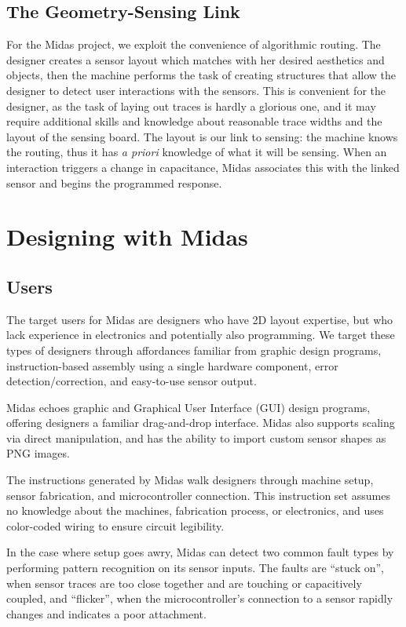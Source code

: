 \subsection{The Geometry-Sensing Link}

For the Midas project, we exploit the convenience of algorithmic routing. The designer creates a sensor layout which matches with her desired aesthetics and objects, then the machine performs the task of creating structures that allow the designer to detect user interactions with the sensors. This is convenient for the designer, as the task of laying out traces is hardly a glorious one, and it may require additional skills and knowledge about reasonable trace widths and the layout of the sensing board. The layout is our link to sensing: the machine knows the routing, thus it has \emph{a priori} knowledge of what it will be sensing. When an interaction triggers a change in capacitance, Midas associates this with the linked sensor and begins the programmed response.

\section{Designing with Midas}
    \subsection{Users}
    
    The target users for Midas are designers who have 2D layout expertise, but who lack experience in electronics and potentially also programming. We target these types of designers through affordances familiar from graphic design programs, instruction-based assembly using a single hardware component, error detection/correction, and easy-to-use sensor output.

Midas echoes graphic and Graphical User Interface (GUI) design programs, offering designers a familiar drag-and-drop interface. Midas also supports scaling via direct manipulation, and has the ability to import custom sensor shapes as PNG images.

The instructions generated by Midas walk designers through machine setup, sensor fabrication, and microcontroller connection. This instruction set assumes no knowledge about the machines, fabrication process, or electronics, and uses color-coded wiring to ensure circuit legibility.

In the case where setup goes awry, Midas can detect two common fault types by performing pattern recognition on its sensor inputs. The faults are ``stuck on'', when sensor traces are too close together and are touching or capacitively coupled, and ``flicker'', when the microcontroller's connection to a sensor rapidly changes and indicates a poor attachment.

